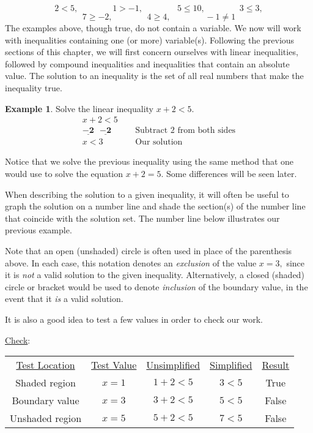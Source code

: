 \documentclass[12pt]{book}
\theoremstyle{definition}
\newtheorem{example}{Example}
\newcommand{\tmmathbf}[1]{\ensuremath{\boldsymbol{#1}}}
\begin{document}
$$2<5, \qquad\qquad 1>-1, \qquad\qquad 5\leq 10, \qquad\qquad 3\leq 3,$$
$$7\geq-2, \qquad\qquad 4\geq 4, \qquad\qquad -1\neq 1$$
The examples above, though true, do not contain a variable.  We now will work with inequalities containing one (or more) variable(s).  Following the previous sections of this chapter, we will first concern ourselves with linear inequalities, followed by compound inequalities and inequalities that contain an absolute value.  The solution to an inequality is the set of all real numbers that make the inequality true.\par
\begin{example}\label{Lin92} Solve the linear inequality  $x+2<5$. 
\begin{eqnarray*}
x+2<5~~ && \\
\tmmathbf{\underline{-2}~~~\underline{-2}} && \text{Subtract~} 2 \text{~from~both~sides} \\
x<3~~ && \text{Our~solution}
\end{eqnarray*}
\end{example}
Notice that we solve the previous inequality using the same method that one would use to solve the equation $x+2=5$.  Some differences will be seen later.\par
When describing the solution to a given inequality, it will often be useful to graph the solution on a number line and shade the section(s) of the number line that coincide with the solution set.  The number line below illustrates our previous example.
\begin{center}
\end{center}
Note that an open (unshaded) circle is often used in place of the parenthesis above.  In each case, this notation denotes an {\it exclusion} of the value $x=3,$ since it is {\it not} a valid solution to the given inequality.  Alternatively, a closed (shaded) circle or bracket would be used to denote {\it inclusion} of the boundary value, in the event that it {\it is} a valid solution.\par
It is also a good idea to test a few values in order to check our work.\par
\underline{Check}:\par
\begin{center}
\begin{tabular}{ccccc}
\underline{Test Location} & \underline{Test Value} & \underline{Unsimplified} & \underline{Simplified} & \underline{Result}\\
Shaded region & $x=1$ & $1+2<5$ & $3<5$ & True\\
Boundary value & $x=3$ & $3+2<5$ & $5<5$ & False\\
Unshaded region & $x=5$ & $5+2<5$ & $7<5$ & False
\end{tabular}
\end{center}
\end{document}
